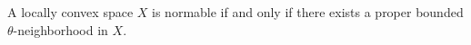 A locally convex space $X$ is normable if and only if there exists a proper bounded $\theta$-neighborhood in $X$.
